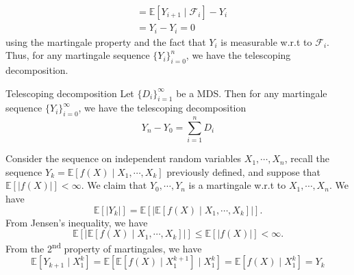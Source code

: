 \documentclass[10pt,handout,english]{beamer}
\newcommand{\ts}{\textsuperscript}
\newcommand{\E}{\mathbb{E}}
\newcommand{\F}{\mathcal{F}}
\newcommand{\1}{\mathbbm{1}}
\begin{document}
\begin{frame}[allowframebreaks]
\begin{align*}
&=\E[Y_{i+1}\mid\F_i]-Y_i\\
&=Y_i-Y_i=0
\end{align*}
using the martingale property and the fact that $Y_i$ is measurable w.r.t to $\F_i$. Thus, for any martingale sequence $\{Y_i\}_{i=0}^{n}$, we have the telescoping decomposition.
\begin{block}{Telescoping decomposition}
Let $\{D_i\}_{i=1}^{\infty}$ be a MDS. Then for any martingale sequence $\{Y_i\}_{i=0}^{\infty}$, we have the telescoping decomposition
\[
Y_n-Y_0=\sum\limits_{i=1}^{n}D_i
\]
\end{block} 
\begin{example}
Consider the sequence on independent random variables $X_1,\cdots,X_n$, recall the sequence $Y_{k}=\E[f(X)\mid X_1,\cdots,X_k]$ previously defined, and suppose that $\E[\lvert f(X) \rvert]<\infty$. We claim that $Y_0,\cdots,Y_n$ is a martingale w.r.t to $X_1,\cdots,X_n$. We have
\[
\E[\lvert Y_k\rvert]=\E[\lvert\E[f(X)\mid X_1,\cdots,X_k]\rvert].
\] 
From Jensen's inequality, we have 
\[
\E[\lvert\E[f(X)\mid X_1,\cdots,X_k]\rvert]\leq\E[\lvert f(X)\rvert]<\infty.
\] 
From the 2\ts{nd} property of martingales, we have
\[ 
\E[Y_{k+1}\mid X_{1}^k]=\E[\E[f(X)\mid X_{1}^{k+1}]\mid X_{1}^{k}]=\E[f(X)\mid X_{1}^{k}]=Y_k
\]
\end{example}
\end{frame}
\end{document}
